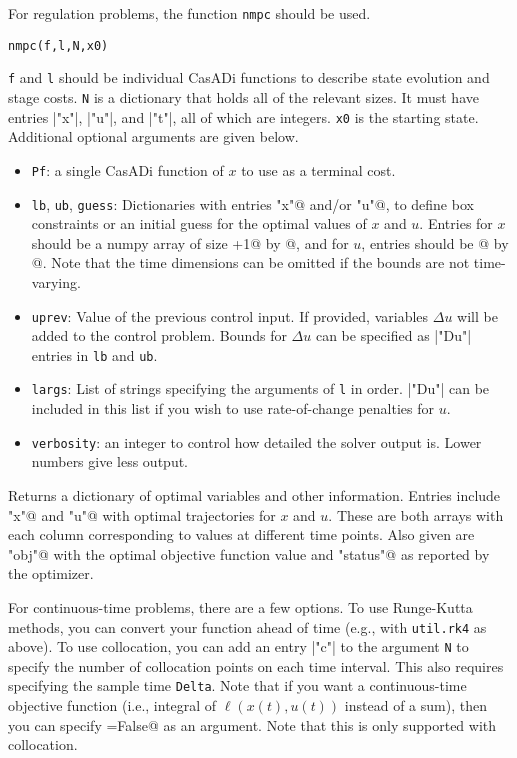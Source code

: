 \documentclass{article}
\providecommand{\lstinline}{}
\newcommand{\funcname}[2][.25em]{\vspace{#1}\noindent\texttt{#2}\nopagebreak\vspace{#1}}
\newcommand{\casadi}{CasADi}
\begin{document}
\begin{multicols}{2}
For regulation problems, the function \texttt{nmpc} should be used.

\funcname{nmpc(f,l,N,x0)}

\texttt{f} and \texttt{l} should be individual \casadi{} functions to describe state evolution and stage costs.
\texttt{N} is a dictionary that holds all of the relevant sizes.
It must have entries \lstinline|"x"|, \lstinline|"u"|, and \lstinline|"t"|, all of which are integers.
\texttt{x0} is the starting state.
Additional optional arguments are given below.

\begin{itemize}[noitemsep,nolistsep]
    \item \texttt{Pf}: a single \casadi{} function of $x$ to use as a terminal cost.
    \item \texttt{lb}, \texttt{ub}, \texttt{guess}: Dictionaries with entries \lstinline@"x"@ and/or \lstinline@"u"@, to define box constraints or an initial guess for the optimal values of $x$ and $u$.
    Entries for $x$ should be a numpy array of size \lstinline@N["t"]+1@ by \lstinline@N["x"]@, and for $u$, entries should be \lstinline@N["t"]@ by \lstinline@N["u"]@.
    Note that the time dimensions can be omitted if the bounds are not time-varying.
    \item \texttt{uprev}: Value of the previous control input.
    If provided, variables $\Delta u$ will be added to the control problem.
    Bounds for $\Delta u$ can be specified as \lstinline|"Du"| entries in \texttt{lb} and \texttt{ub}.
    \item \texttt{largs}: List of strings specifying the arguments of \texttt{l} in order.
    \lstinline|"Du"| can be included in this list if you wish to use rate-of-change penalties for $u$.
    \item \texttt{verbosity}: an integer to control how detailed the solver output is.
    Lower numbers give less output.
\end{itemize}

Returns a dictionary of optimal variables and other information.
Entries include \lstinline@"x"@ and \lstinline@"u"@ with optimal trajectories for $x$ and $u$.
These are both arrays with each column corresponding to values at different time points.
Also given are \lstinline@"obj"@ with the optimal objective function value and \lstinline@"status"@ as reported by the optimizer.

For continuous-time problems, there are a few options.
To use Runge-Kutta methods, you can convert your function ahead of time (e.g., with \texttt{util.rk4} as above).
To use collocation, you can add an entry \lstinline|"c"| to the argument \texttt{N} to specify the number of collocation points on each time interval.
This also requires specifying the sample time \texttt{Delta}.
Note that if you want a continuous-time objective function (i.e., integral of $\ell(x(t),u(t))$ instead of a sum), then you can specify \lstinline@discretel=False@ as an argument.
Note that this is only supported with collocation.


\end{multicols}
\end{document}
